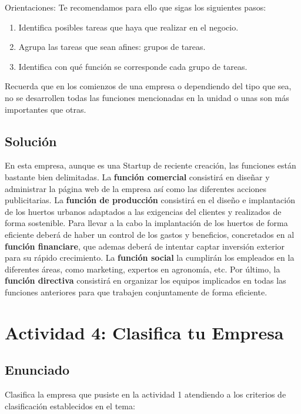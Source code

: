 Orientaciones: Te recomendamos para ello que sigas los siguientes pasos:

\begin{enumerate}
    \item Identifica posibles tareas que haya que realizar en el negocio.
    \item Agrupa las tareas que sean afines: grupos de tareas.
    \item Identifica con qué función se corresponde cada grupo de tareas.
\end{enumerate}

Recuerda que en los comienzos de una empresa o dependiendo del tipo que sea, no se desarrollen todas las funciones mencionadas en la unidad o unas son más importantes que otras.

\subsection{Solución}
En esta empresa, aunque es una Startup de reciente creación, las funciones están bastante bien delimitadas. La \textbf{función comercial} consistirá en diseñar y administrar la página web de la empresa así como las diferentes acciones publicitarias. La \textbf{función de producción} consistirá en el diseño e implantación de los huertos urbanos adaptados a las exigencias del clientes y realizados de forma sostenible. Para llevar a la cabo la implantación de los huertos de forma eficiente deberá de haber un control de los gastos y beneficios, concretados en al \textbf{función financiare}, que ademas deberá de intentar captar inversión exterior para su rápido crecimiento. La \textbf{función social} la cumplirán los empleados en la diferentes áreas, como marketing, expertos en agronomía, etc.  Por último, la \textbf{función directiva} consistirá en organizar los equipos implicados en todas las funciones anteriores para que trabajen conjuntamente de forma eficiente.

\section{Actividad 4: Clasifica tu Empresa}

\subsection{Enunciado}
Clasifica la empresa que pusiste en la actividad 1 atendiendo a los criterios de clasificación establecidos en el tema:

